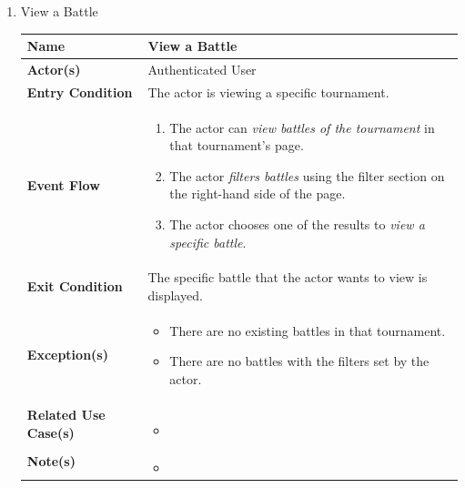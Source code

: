 \begin{enumerate}
\item View a Battle
    \begin{center}
    \begin{tabular}{ | m{10em} | m{10cm}| } 
      \hline
      \textbf{Name} & View a Battle  \\ 
      \hline
      \textbf{Actor(s)} & Authenticated User \\ 
      \hline
      \textbf{Entry Condition} & The actor is viewing a specific tournament. \\ 
      \hline
      \textbf{Event Flow} & 
          \begin{enumerate}[(1)]
              \item The actor can \textit{view battles of the tournament} in that tournament's page.
              \item The actor \textit{filters battles} using the filter section on the right-hand side of the page.
              \item The actor chooses one of the results to \textit{view a specific battle}.
          \end{enumerate}
      \\ 
      \hline
      \textbf{Exit Condition} & The specific battle that the actor wants to view is displayed.  \\ 
      \hline
      \textbf{Exception(s)} & 
      \begin{itemize}
          \item There are no existing battles in that tournament.
          \item There are no battles with the filters set by the actor.
      \end{itemize}
          \\ 
      \hline
      \textbf{Related Use Case(s)} & 
      \begin{itemize}
          \item 
      \end{itemize}
          \\ 
      \hline
      \textbf{Note(s)} & 
      \begin{itemize}
          \item 
      \end{itemize}
          \\ 
      \hline
    \end{tabular}
\end{center}



\end{enumerate}
